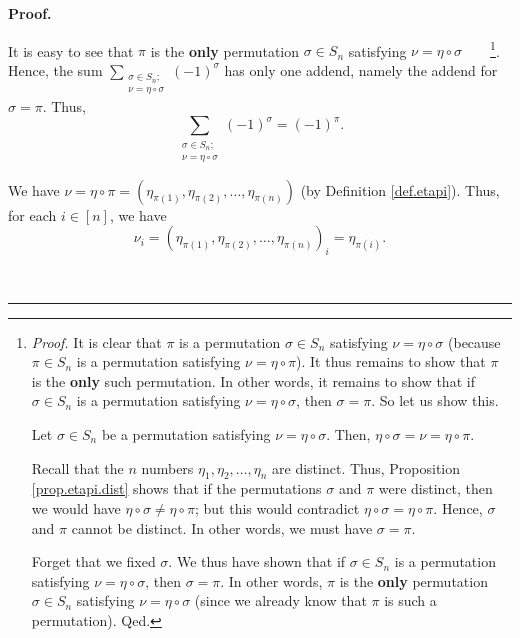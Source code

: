 \documentclass
[numbers=enddot,12pt,final,onecolumn,notitlepage,english]{scrartcl}%
\theoremstyle{definition}
\newenvironment{proof}[1][Proof]{\noindent\textbf{#1.} }{\ \rule{0.5em}{0.5em}}
\let\sumnonlimits\sum
\renewcommand{\sum}{\sumnonlimits\limits}
\newenvironment{verlong}{}{}
\newenvironment{vershort}{}{}
\begin{document}
\begin{proof}
\begin{vershort}
\end{vershort}

\begin{verlong}
It is easy to see that $\pi$ is the \textbf{only} permutation $\sigma\in
S_{n}$ satisfying $\nu=\eta\circ\sigma$\ \ \ \ \footnote{\textit{Proof.} It is
clear that $\pi$ is a permutation $\sigma\in S_{n}$ satisfying $\nu=\eta
\circ\sigma$ (because $\pi\in S_{n}$ is a permutation satisfying $\nu
=\eta\circ\pi$). It thus remains to show that $\pi$ is the \textbf{only} such
permutation. In other words, it remains to show that if $\sigma\in S_{n}$ is a
permutation satisfying $\nu=\eta\circ\sigma$, then $\sigma=\pi$. So let us
show this.
\par
Let $\sigma\in S_{n}$ be a permutation satisfying $\nu=\eta\circ\sigma$. Then,
$\eta\circ\sigma=\nu=\eta\circ\pi$.
\par
Recall that the $n$ numbers $\eta_{1},\eta_{2},\ldots,\eta_{n}$ are distinct.
Thus, Proposition \ref{prop.etapi.dist} shows that if the permutations
$\sigma$ and $\pi$ were distinct, then we would have $\eta\circ\sigma\neq
\eta\circ\pi$; but this would contradict $\eta\circ\sigma=\eta\circ\pi$.
Hence, $\sigma$ and $\pi$ cannot be distinct. In other words, we must have
$\sigma=\pi$.
\par
Forget that we fixed $\sigma$. We thus have shown that if $\sigma\in S_{n}$ is
a permutation satisfying $\nu=\eta\circ\sigma$, then $\sigma=\pi$. In other
words, $\pi$ is the \textbf{only} permutation $\sigma\in S_{n}$ satisfying
$\nu=\eta\circ\sigma$ (since we already know that $\pi$ is such a
permutation). Qed.}. Hence, the sum $\sum_{\substack{\sigma\in S_{n}%
;\\\nu=\eta\circ\sigma}}\left(  -1\right)  ^{\sigma}$ has only one addend,
namely the addend for $\sigma=\pi$. Thus,
\begin{equation}
\sum_{\substack{\sigma\in S_{n};\\\nu=\eta\circ\sigma}}\left(  -1\right)
^{\sigma}=\left(  -1\right)  ^{\pi}. \label{pf.lem.nu-det.c2.sum=}%
\end{equation}

\end{verlong}

We have $\nu=\eta\circ\pi=\left(  \eta_{\pi\left(  1\right)  },\eta
_{\pi\left(  2\right)  },\ldots,\eta_{\pi\left(  n\right)  }\right)  $ (by
Definition \ref{def.etapi}). Thus, for each $i\in\left[  n\right]  $, we have
\begin{equation}
\nu_{i}=\left(  \eta_{\pi\left(  1\right)  },\eta_{\pi\left(  2\right)
},\ldots,\eta_{\pi\left(  n\right)  }\right)  _{i}=\eta_{\pi\left(  i\right)
}. \label{pf.lem.nu-det.c2.nui=}%
\end{equation}



\end{proof}
\end{document}
